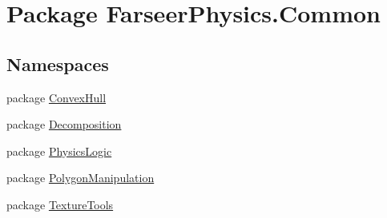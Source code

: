 \hypertarget{namespace_farseer_physics_1_1_common}{\section{Package Farseer\+Physics.\+Common}
\label{namespace_farseer_physics_1_1_common}
}
\subsection*{Namespaces}
\begin{DoxyCompactItemize}
\item 
package \hyperlink{namespace_farseer_physics_1_1_common_1_1_convex_hull}{Convex\+Hull}
\item 
package \hyperlink{namespace_farseer_physics_1_1_common_1_1_decomposition}{Decomposition}
\item 
package \hyperlink{namespace_farseer_physics_1_1_common_1_1_physics_logic}{Physics\+Logic}
\item 
package \hyperlink{namespace_farseer_physics_1_1_common_1_1_polygon_manipulation}{Polygon\+Manipulation}
\item 
package \hyperlink{namespace_farseer_physics_1_1_common_1_1_texture_tools}{Texture\+Tools}
\end{DoxyCompactItemize}
